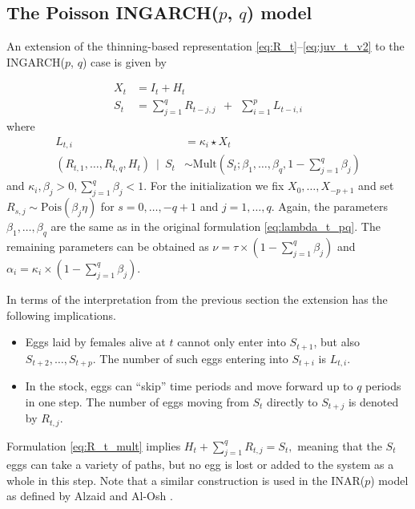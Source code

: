 \documentclass{article}
\begin{document}
\subsection{The Poisson INGARCH($p$, $q$) model}
\label{subsec:poinssonpq}

An extension of the thinning-based representation \eqref{eq:R_t}--\eqref{eq:juv_t_v2} to the INGARCH($p$, $q$) case is given by

\begin{align}
X_t & = I_t + H_t\\
S_t & = \sum_{j = 1}^q R_{t - j, j} \ \ + \ \ \sum_{i = 1}^p L_{t - i, i}
\end{align}
where
\begin{align}
L_{t, i} & = \kappa_i \star X_t\\
(R_{t, 1}, \dots, R_{t, q}, H_t) \ \mid \ S_t & \sim \text{Mult}\left(S_t; \beta_1, \dots, \beta_q, 1 - \sum_{j = 1}^q \beta_j\right)\label{eq:R_t_mult}
\end{align}
and $\kappa_i, \beta_j > 0, \sum_{j = 1}^q \beta_j < 1$. For the initialization we fix $X_0, \dots, X_{-p + 1}$ and set $R_{s, j} \sim \text{Pois}(\beta_j\eta)$ for $s = 0, \dots, -q + 1$ and $j = 1, \dots, q$. Again, the parameters $\beta_{1}, \dots, \beta_q$ are the same as in the original formulation \eqref{eq:lambda_t_pq}. The remaining  parameters can be obtained as $\nu = \tau \times \left(1 - \sum_{j = 1}^q\beta_j \right)$ and $\alpha_i = \kappa_i \times \left(1 - \sum_{j = 1}^q\beta_j \right)$.

In terms of the interpretation from the previous section the extension has the following implications.
\begin{itemize}
\item Eggs laid by females alive at $t$ cannot only enter into $S_{t + 1}$, but also $S_{t + 2}, \dots, S_{t + p}$. The number of such eggs entering into $S_{t + i}$ is $L_{t, i}$.
\item In the stock, eggs can ``skip'' time periods and move forward up to $q$ periods in one step. The number of eggs moving from $S_t$ directly to $S_{t + j}$ is denoted by $R_{t, j}$.
\end{itemize}

Formulation \eqref{eq:R_t_mult} implies $H_t + \sum_{j = 1}^q R_{t, j} = S_t,$ meaning that the $S_t$ eggs can take a variety of paths, but no egg is lost or added to the system as a whole in this step. Note that a similar construction is used in the INAR($p$) model as defined by Alzaid and Al-Osh \cite{Alzaid1990}.
\end{document}
